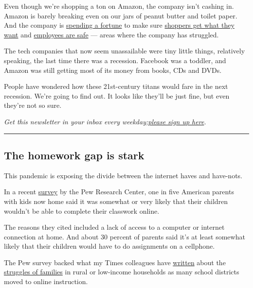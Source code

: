 Even though we're shopping a ton on Amazon, the company isn't cashing
in. Amazon is barely breaking even on our jars of peanut butter and
toilet paper. And the company is
\href{https://www.nytimes3xbfgragh.onion/2020/04/30/technology/amazon-stock-earnings-report.html}{spending
a fortune} to make sure
\href{https://www.nytimes3xbfgragh.onion/2020/04/22/technology/coronavirus-amazon-shopping.html}{shoppers
get what they want} and
\href{https://www.nytimes3xbfgragh.onion/2020/04/05/technology/coronavirus-amazon-workers.html}{employees
are safe} --- areas where the company has struggled.

The tech companies that now seem unassailable were tiny little things,
relatively speaking, the last time there was a recession. Facebook was a
toddler, and Amazon was still getting most of its money from books, CDs
and DVDs.

People have wondered how these 21st-century titans would fare in the
next recession. We're going to find out. It looks like they'll be just
fine, but even they're not so sure.

\emph{Get this newsletter in your inbox every
weekday;}\href{https://www.nytimes3xbfgragh.onion/newsletters/signup/OT}{\emph{please
sign up here}}\emph{.}

\begin{center}\rule{0.5\linewidth}{\linethickness}\end{center}

\hypertarget{the-homework-gap-is-stark}{%
\subsection{The homework gap is stark}\label{the-homework-gap-is-stark}}

This pandemic is exposing the divide between the internet haves and
have-nots.

In a recent
\href{https://www.pewresearch.org/internet/2020/04/30/53-of-americans-say-the-internet-has-been-essential-during-the-covid-19-outbreak/}{survey}
by the Pew Research Center, one in five American parents with kids now
home said it was somewhat or very likely that their children wouldn't be
able to complete their classwork online.

The reasons they cited included a lack of access to a computer or
internet connection at home. And about 30 percent of parents said it's
at least somewhat likely that their children would have to do
assignments on a cellphone.

The Pew survey backed what my Times colleagues have
\href{https://www.nytimes3xbfgragh.onion/2020/03/26/nyregion/new-york-homeless-students-coronavirus.html}{written}
about the
\href{https://www.nytimes3xbfgragh.onion/2020/04/06/us/coronavirus-schools-attendance-absent.html}{struggles
of families} in rural or low-income households as many school districts
moved to online instruction.

